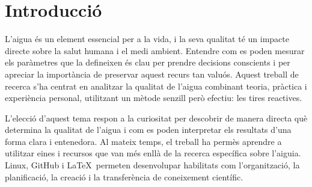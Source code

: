\chapter{Introducció}
\label{c:intro}
%
%
%
%

L’aigua és un element essencial per a la vida, i la seva qualitat té un impacte directe sobre la salut humana i el medi ambient. Entendre com es poden mesurar els paràmetres que la defineixen és clau per prendre decisions conscients i per apreciar la importància de preservar aquest recurs tan valuós. Aquest treball de recerca s’ha centrat en analitzar la qualitat de l’aigua combinant teoria, pràctica i experiència personal, utilitzant un mètode senzill però efectiu: les tires reactives.

L’elecció d’aquest tema respon a la curiositat per descobrir de manera directa què determina la qualitat de l’aigua i com es poden interpretar els resultats d’una forma clara i entenedora. Al mateix temps, el treball ha permès aprendre a utilitzar eines i recursos que van més enllà de la recerca específica sobre l'aiguia. Linux, GitHub i \LaTeX~permeten desenvolupar habilitats com l’organització, la planificació, la creació i la transferència de coneixement científic.

